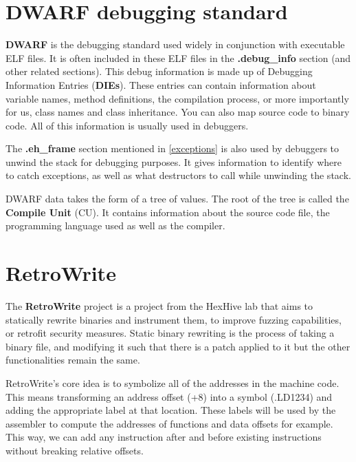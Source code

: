 \documentclass[a4paper,11pt,oneside]{report}
\begin{document}
\section{DWARF debugging standard}
\label{dwarf}

\textbf{DWARF} is the debugging standard used widely in conjunction with 
executable ELF files.
It is often included in these ELF files in the \textbf{.debug\_info} section 
(and other related sections).
This debug information is made up of Debugging Information Entries 
(\textbf{DIEs}).
These entries can contain information about variable names, method definitions, 
the compilation process, or more importantly for us, class names and class 
inheritance. You can also map source code to binary code.
All of this information is usually used in debuggers.

The \textbf{.eh\_frame} section mentioned in \autoref{exceptions} is also used
by debuggers to unwind the stack for debugging purposes.
It gives information to identify where to catch exceptions, as well as what
destructors to call while unwinding the stack.

DWARF data takes the form of a tree of values.
The root of the tree is called the \textbf{Compile Unit} (CU).
It contains information about the source code file, the programming language
used as well as the compiler.

\section{RetroWrite} \label{retrowritesection}


The \textbf{RetroWrite}\cite{dinesh20oakland} project is a project from the
HexHive lab that aims to statically rewrite binaries and instrument them, to
improve fuzzing capabilities, or retrofit security measures.
Static binary rewriting is the process of taking a binary file, and modifying
it such that there is a patch applied to it but the other functionalities
remain the same.

RetroWrite's core idea is to symbolize all of the addresses in the machine
code. This means transforming an address offset (+8) into a symbol
(.LD1234) and adding the appropriate label at that location.
These labels will be used by the assembler to compute the addresses of
functions and data offsets for example.
This way, we can add any instruction after and before existing instructions
without breaking relative offsets.
\end{document}
